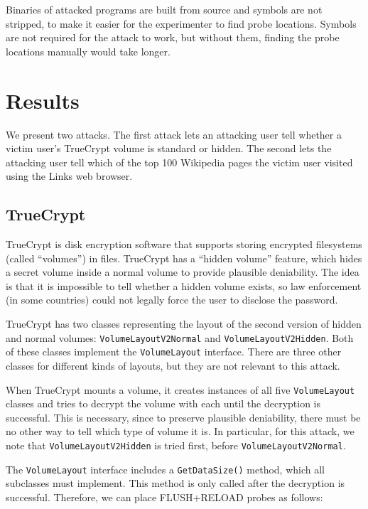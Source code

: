 \documentclass{acm_proc_article-sp}
\begin{document}
Binaries of attacked programs are built from source and symbols are not
stripped, to make it easier for the experimenter to find probe locations.
Symbols are not required for the attack to work, but without them, finding the
probe locations manually would take longer.

\section{Results}
\label{sec:results}

We present two attacks. The first attack lets an attacking user tell whether
a victim user's TrueCrypt volume is standard or hidden. The second lets the
attacking user tell which of the top 100 Wikipedia pages the victim user visited
using the Links web browser.

\subsection{TrueCrypt}

TrueCrypt is disk encryption software that supports storing encrypted
filesystems (called ``volumes'') in files. TrueCrypt has a ``hidden volume''
feature, which hides a secret volume inside a normal volume to provide plausible
deniability. The idea is that it is impossible to tell whether a hidden volume
exists, so law enforcement (in some countries) could not legally force the user
to disclose the password.

TrueCrypt has two classes representing the layout of the second version of
hidden and normal volumes: \texttt{VolumeLayoutV2Normal} and
\texttt{VolumeLayoutV2Hidden}. Both of these classes implement the
\texttt{VolumeLayout} interface. There are three other classes for different
kinds of layouts, but they are not relevant to this attack. 

When TrueCrypt mounts a volume, it creates instances of all five
\texttt{VolumeLayout} classes and tries to decrypt the volume with each until
the decryption is successful. This is necessary, since to preserve plausible
deniability, there must be no other way to tell which type of volume it is. In
particular, for this attack, we note that \texttt{VolumeLayoutV2Hidden} is tried
first, before \texttt{VolumeLayoutV2Normal}.

The \texttt{VolumeLayout} interface includes a \texttt{GetDataSize()} method,
which all subclasses must implement. This method is only called after the
decryption is successful. Therefore, we can place FLUSH+RELOAD probes as
follows:
\end{document}
